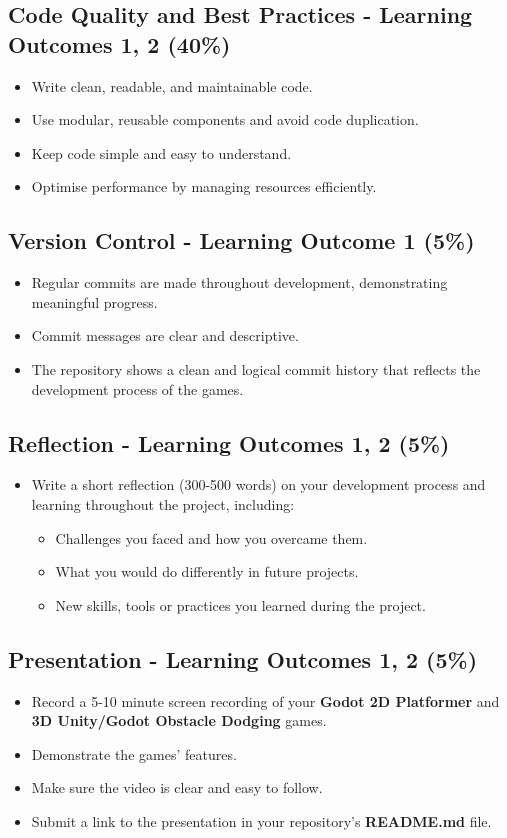 \documentclass{article}
\begin{document}
	\subsection*{Code Quality and Best Practices - Learning Outcomes 1, 2 (40\%)}
	\begin{itemize}
		\item Write clean, readable, and maintainable code.
		\item Use modular, reusable components and avoid code duplication.
		\item Keep code simple and easy to understand.
		\item Optimise performance by managing resources efficiently.
	\end{itemize}
	
	\subsection*{Version Control - Learning Outcome 1 (5\%)}
	\begin{itemize}
	  \item Regular commits are made throughout development, demonstrating meaningful progress.
	  \item Commit messages are clear and descriptive.
	  \item The repository shows a clean and logical commit history that reflects the development process of the games.
	\end{itemize} 
	
	\subsection*{Reflection - Learning Outcomes 1, 2 (5\%)}
	\begin{itemize}
	  \item Write a short reflection (300-500 words) on your development process and learning throughout the project, including:
	  \begin{itemize}
		\item Challenges you faced and how you overcame them.
		\item What you would do differently in future projects.
		\item New skills, tools or practices you learned during the project.
	  \end{itemize}
	\end{itemize}
	
	\subsection*{Presentation - Learning Outcomes 1, 2 (5\%)}
	\begin{itemize}
	  \item Record a 5-10 minute screen recording of your \textbf{Godot 2D Platformer} and \textbf{3D Unity/Godot Obstacle Dodging} games.
	  \item Demonstrate the games' features.
	  \item Make sure the video is clear and easy to follow.
	  \item Submit a link to the presentation in your repository's \textbf{README.md} file.
	\end{itemize}
\end{document}
